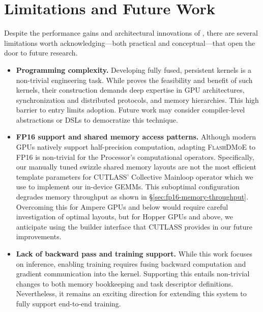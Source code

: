 \section{Limitations and Future Work}\label{sec:limitations}
Despite the performance gains and architectural innovations of \sysname, there are several limitations
worth acknowledging---both practical and conceptual---that open the door to future research.
\begin{itemize}
    \item \textbf{Programming complexity.} Developing fully fused, persistent kernels is a non-trivial engineering task.
    While \sysname proves the feasibility and benefit of such kernels,
    their construction demands deep expertise in GPU architectures,
    synchronization and distributed protocols, and memory hierarchies.
    This high barrier to entry limits adoption.
    Future work may consider compiler-level abstractions or DSLs to democratize this technique.

    \item \textbf{FP16 support and shared memory access patterns.}
    Although modern GPUs natively support half-precision computation,
    adapting \textsc{FlashDMoE} to FP16 is non-trivial for the Processor's computational operators.
    Specifically, our manually tuned swizzle shared memory layouts are not the most efficient
    template parameters for CUTLASS' Collective Mainloop operator which we use to implement our in-device GEMMs.
    This suboptimal configuration degrades memory throughput as shown in \S\ref{sec:fp16-memory-throughput}.
    Overcoming this for Ampere GPUs and below would require careful investigation of optimal layouts, but
    for Hopper GPUs and above, we anticipate using the builder interface that CUTLASS provides in our future improvements.

    \item \textbf{Lack of backward pass and training support.} While this work focuses on inference,
    enabling training requires fusing backward computation and gradient communication into the kernel.
    Supporting this entails non-trivial changes to both memory bookkeeping and task descriptor definitions.
    Nevertheless, it remains an exciting direction for extending this system to
    fully support end-to-end training.
\end{itemize}
